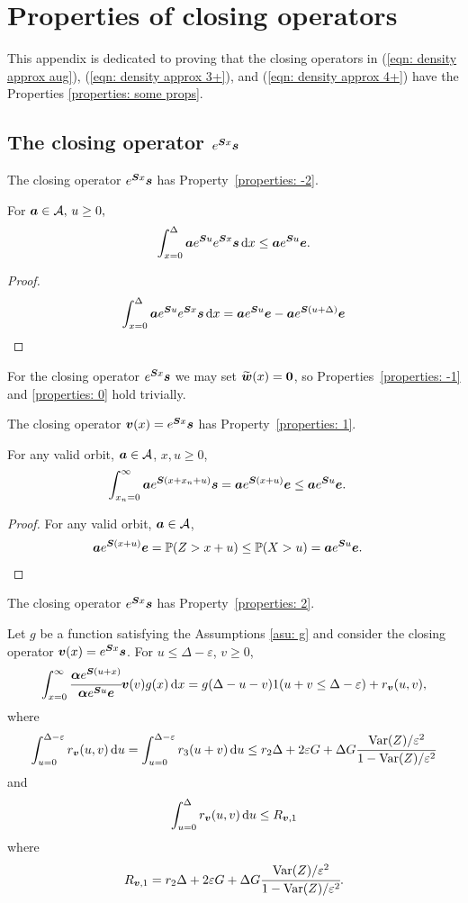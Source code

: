 \chapter{Properties of closing operators}\label{appendix: sec: 2}
This appendix is dedicated to proving that the closing operators in (\ref{eqn: density approx aug}), (\ref{eqn: density approx 3+}), and (\ref{eqn: density approx 4+}) have the Properties \ref{properties: some props}.  

\section{The closing operator \(e^{\boldsymbol S x}\boldsymbol s\)}
\begin{cor}
	The closing operator \(e^{\boldsymbol S x}\boldsymbol s\) has Property~\ref{properties: -2}.
	
	For \(\boldsymbol a\in\mathcal A,\, u\geq 0, \)
	\[\int_{x=0}^\Delta \boldsymbol a e^{\boldsymbol Su}e^{\boldsymbol Sx}\boldsymbol s\, \mathrm{d} x \leq \boldsymbol a e^{\boldsymbol Su}\boldsymbol e.\]	
\end{cor}
\begin{proof}
	\[\int_{x=0}^\Delta \boldsymbol a e^{\boldsymbol Su}e^{\boldsymbol Sx}\boldsymbol s\, \mathrm{d} x = \boldsymbol a e^{\boldsymbol Su}\boldsymbol e-\boldsymbol a e^{\boldsymbol S(u+\Delta)}\boldsymbol e\]
\end{proof}
For the closing operator \(e^{\boldsymbol Sx}\boldsymbol s\) we may set \(\widetilde{\boldsymbol w}(x) = \boldsymbol 0\), so Properties~\ref{properties: -1} and \ref{properties: 0} hold trivially.
\begin{lem}\label{lem: akc}
The closing operator \(\boldsymbol v(x) = e^{\boldsymbol Sx}\boldsymbol s\) has Property~\ref{properties: 1}.

For any valid orbit, \(\boldsymbol a\in\mathcal A\), \(x,u\geq 0\), 
    \begin{align*}
		\int_{x_n=0}^\infty \boldsymbol a e^{\boldsymbol{S}(x+x_n+u)}\boldsymbol s = \boldsymbol a e^{\boldsymbol{S}(x+u)}\boldsymbol e &\leq \boldsymbol a e^{\boldsymbol{S}u}\boldsymbol e. 
	\end{align*}
\end{lem}
\begin{proof}
	For any valid orbit, \(\boldsymbol a\in\mathcal A\), 
        \begin{align*}
        		\boldsymbol a e^{\boldsymbol{S}(x+u)}\boldsymbol e &= \mathbb P(Z>x+u) \leq\mathbb P(X>u) = \boldsymbol a e^{\boldsymbol Su} \boldsymbol e. 
	\end{align*}
\end{proof}
\begin{cor}\label{cor: cond bnd 2 V}
	The closing operator \(e^{\boldsymbol S x}\boldsymbol s\) has Property~\ref{properties: 2}.

	Let \(g\) be a function satisfying the Assumptions \ref{asu: g} and consider the closing operator \({\boldsymbol v}(x)=e^{\boldsymbol Sx}\boldsymbol s\). For \(u\leq \Delta-\varepsilon \), \(v\geq 0\), 
	\[\int_{x=0}^\infty \cfrac{\boldsymbol \alpha  e^{\boldsymbol{S} (u+x)} }{\boldsymbol \alpha  e^{\boldsymbol{S} u} \boldsymbol e} {\boldsymbol v}(v)g(x)\, \mathrm{d} x = g(\Delta-u-v) 1(u+v\leq\Delta-\varepsilon) + r_{\boldsymbol v} (u,v),\]
	where \[\displaystyle\int_{u=0}^{\Delta-\varepsilon}r_{\boldsymbol v}(u,v)\, \mathrm{d} u = \displaystyle\int_{u=0}^{\Delta-\varepsilon} r_3(u+v)\, \mathrm{d} u \leq r_2\Delta + 2\varepsilon G + \Delta G \cfrac{\mathrm{Var}(Z)/\varepsilon^2}{1-\mathrm{Var}(Z)/\varepsilon^2}\]
	and \[\int_{u=0}^\Delta r_{\boldsymbol v}(u,v) \, \mathrm{d} u\leq R_{{\boldsymbol v},1}\] where \[R_{{\boldsymbol v},1}=r_2\Delta + 2\varepsilon G + \Delta G \cfrac{\mathrm{Var}(Z)/\varepsilon^2}{1-\mathrm{Var}(Z)/\varepsilon^2}.\] 
\end{cor}
